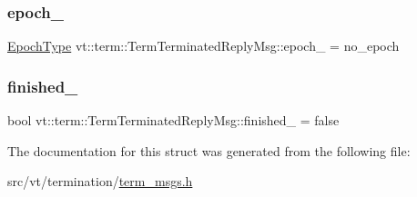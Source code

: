 \subsubsection{\texorpdfstring{epoch\+\_\+}{epoch\_}}
{\footnotesize\ttfamily \hyperlink{namespacevt_a81d11b28122d43bf9834577e4a06440f}{Epoch\+Type} vt\+::term\+::\+Term\+Terminated\+Reply\+Msg\+::epoch\+\_\+ = no\+\_\+epoch\hspace{0.3cm}{\ttfamily [private]}}

\mbox{\label{structvt_1_1term_1_1_term_terminated_reply_msg_a7d5f6264f595981386a08aefee4178f1}} 
\subsubsection{\texorpdfstring{finished\+\_\+}{finished\_}}
{\footnotesize\ttfamily bool vt\+::term\+::\+Term\+Terminated\+Reply\+Msg\+::finished\+\_\+ = false\hspace{0.3cm}{\ttfamily [private]}}



The documentation for this struct was generated from the following file\+:\begin{DoxyCompactItemize}
\item 
src/vt/termination/\hyperlink{term__msgs_8h}{term\+\_\+msgs.\+h}\end{DoxyCompactItemize}
